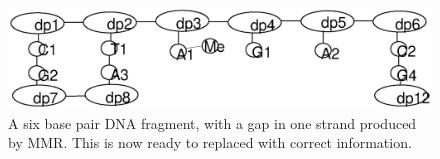 \begin{figure}[h!]
  \centering
    \includegraphics[width=1.0\textwidth]{mmr/state7}
  \caption[A six base pair DNA fragment.]{A six base pair DNA fragment, with a gap in one strand produced by MMR. This is now ready to replaced with correct information.}
  \label{fig:state7}
\end{figure}


